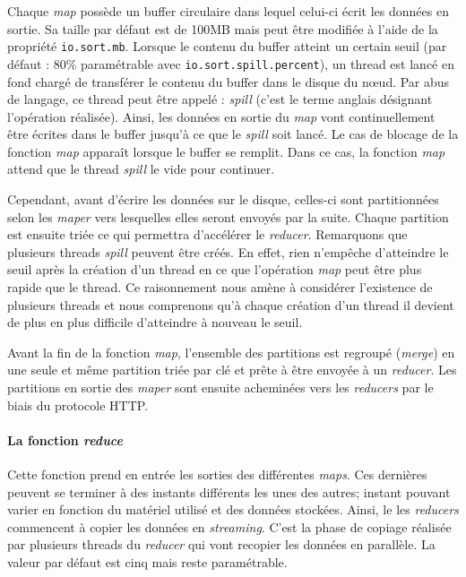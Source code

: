 \par Chaque \emph{map} possède un buffer circulaire dans lequel celui-ci écrit les données en sortie. Sa taille par défaut est de 100MB mais peut être modifiée à l'aide de la propriété \texttt{io.sort.mb}. Lorsque le contenu du buffer atteint un certain seuil (par défaut : 80\% paramétrable avec \texttt{io.sort.spill.percent}), un thread est lancé en fond chargé de transférer le contenu du buffer dans le disque du n\oe{}ud. Par abus de langage, ce thread peut être appelé : \emph{spill} (c'est le terme anglais désignant l'opération réalisée). Ainsi, les données en sortie du \emph{map} vont continuellement être écrites dans le buffer jusqu'à ce que le \emph{spill} soit lancé. Le cas de blocage de la fonction \emph{map} apparaît lorsque le buffer se remplit. Dans ce cas, la fonction \emph{map} attend que le thread \emph{spill} le vide pour continuer.

\par Cependant, avant d'écrire les données sur le disque, celles-ci sont partitionnées selon les \emph{maper} vers lesquelles elles seront envoyés par la suite. Chaque partition est ensuite triée ce qui permettra d'accélérer le \emph{reducer}. Remarquons que plusieurs threads \emph{spill} peuvent être créés. En effet, rien n'empêche d'atteindre le seuil après la création d'un thread en ce que l'opération \emph{map} peut être plus rapide que le thread. Ce raisonnement nous amène à considérer l'existence de plusieurs threads et nous comprenons qu'à chaque création d'un thread il devient de plus en plus difficile d'atteindre à nouveau le seuil.

\par Avant la fin de la fonction \emph{map}, l'ensemble des partitions est regroupé (\emph{merge}) en une seule et même partition triée par clé et prête à être envoyée à un \emph{reducer}. Les partitions en sortie des \emph{maper} sont ensuite acheminées vers les  \emph{reducers} par le biais du protocole HTTP.

\paragraph{La fonction \emph{reduce}} Cette fonction prend en entrée les sorties des différentes \emph{maps}. Ces dernières peuvent se terminer à des instants différents les unes des autres; instant pouvant varier en fonction du matériel utilisé et des données stockées. Ainsi, le les \emph{reducers} commencent à copier les données en \emph{streaming}. C'est la phase de copiage réalisée par plusieurs threads du \emph{reducer} qui vont recopier les données en parallèle. La valeur par défaut est cinq mais reste paramétrable.

